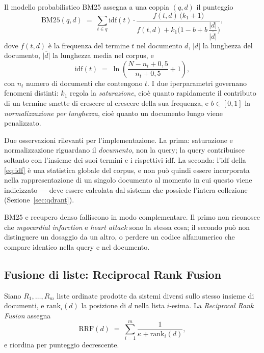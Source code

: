 \documentclass[pdflatex,sn-mathphys-num]{sn-jnl}
\theoremstyle{thmstyleone}
\theoremstyle{thmstyletwo}
\theoremstyle{thmstylethree}
\begin{document}
Il modello probabilistico BM25 \cite{robertson2009bm25} assegna a una coppia $(q,d)$ il punteggio
\begin{equation}
  \mathrm{BM25}(q,d) \;=\; \sum_{t \in q} \mathrm{idf}(t) \cdot \frac{f(t,d)\,\big(k_1 + 1\big)}{f(t,d) + k_1\Big(1 - b + b\,\dfrac{|d|}{\overline{|d|}}\Big)},
  \label{eq:bm25}
\end{equation}
dove $f(t,d)$ è la frequenza del termine $t$ nel documento $d$, $|d|$ la lunghezza del documento, $\overline{|d|}$ la lunghezza media nel corpus, e
\begin{equation}
  \mathrm{idf}(t) \;=\; \ln\!\left(\frac{N - n_t + 0{,}5}{n_t + 0{,}5} + 1\right),
  \label{eq:idf}
\end{equation}
con $n_t$ numero di documenti che contengono $t$. I due iperparametri governano fenomeni distinti: $k_1$ regola la \emph{saturazione}, cioè quanto rapidamente il contributo di un termine smette di crescere al crescere della sua frequenza, e $b \in [0,1]$ la \emph{normalizzazione per lunghezza}, cioè quanto un documento lungo viene penalizzato.

Due osservazioni rilevanti per l'implementazione. La prima: saturazione e normalizzazione riguardano il \emph{documento}, non la query; la query contribuisce soltanto con l'insieme dei suoi termini e i rispettivi $\mathrm{idf}$. La seconda: l'$\mathrm{idf}$ della \eqref{eq:idf} è una statistica globale del corpus, e non può quindi essere incorporata nella rappresentazione di un singolo documento al momento in cui questo viene indicizzato --- deve essere calcolata dal sistema che possiede l'intera collezione (Sezione~\ref{sec:qdrant}).

BM25 e recupero denso falliscono in modo complementare. Il primo non riconosce che \emph{myocardial infarction} e \emph{heart attack} sono la stessa cosa; il secondo può non distinguere un dosaggio da un altro, o perdere un codice alfanumerico che compare identico nella query e nel documento.

\subsection{Fusione di liste: Reciprocal Rank Fusion}\label{sec:rrf}

Siano $R_1, \dots, R_m$ liste ordinate prodotte da sistemi diversi sullo stesso insieme di documenti, e $\mathrm{rank}_i(d)$ la posizione di $d$ nella lista $i$-esima. La \emph{Reciprocal Rank Fusion} \cite{cormack2009rrf} assegna
\begin{equation}
  \mathrm{RRF}(d) \;=\; \sum_{i=1}^{m} \frac{1}{\kappa + \mathrm{rank}_i(d)},
  \label{eq:rrf}
\end{equation}
e riordina per punteggio decrescente.
\end{document}
